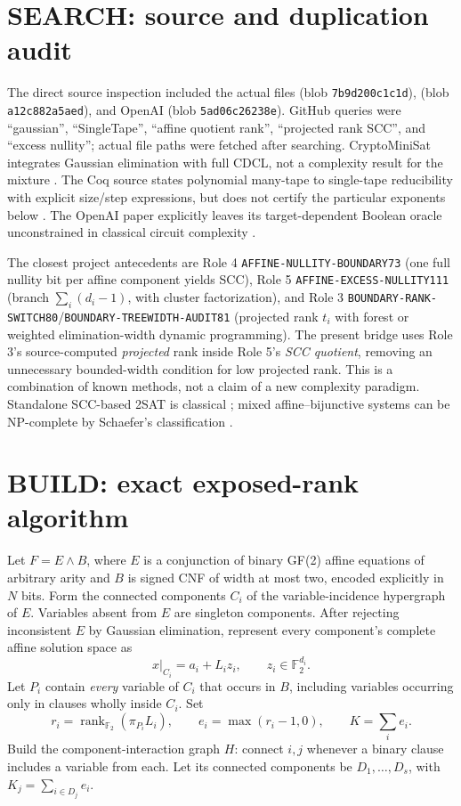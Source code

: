 \documentclass[11pt]{article}
\newcommand{\FF}{\mathbb F_2}
\begin{document}
\section{SEARCH: source and duplication audit}
The direct source inspection included the actual files  (blob \texttt{7b9d200c1c1d}),  (blob \texttt{a12c882a5aed}), and OpenAI  (blob \texttt{5ad06c26238e}). GitHub queries were ``gaussian'', ``SingleTape'', ``affine quotient rank'', ``projected rank SCC'', and ``excess nullity''; actual file paths were fetched after searching. CryptoMiniSat integrates Gaussian elimination with full CDCL, not a complexity result for the mixture \cite{cms}. The Coq source states polynomial many-tape to single-tape reducibility with explicit size/step expressions, but does not certify the particular exponents below \cite{coq}. The OpenAI paper explicitly leaves its target-dependent Boolean oracle unconstrained in classical circuit complexity \cite{openai}.

The closest project antecedents are Role 4 \texttt{AFFINE-NULLITY-BOUNDARY73} (one full nullity bit per affine component yields SCC), Role 5 \texttt{AFFINE-EXCESS-NULLITY111} (branch $\sum_i(d_i-1)$, with cluster factorization), and Role 3 \texttt{BOUNDARY-RANK-SWITCH80}/\texttt{BOUNDARY-TREEWIDTH-AUDIT81} (projected rank $t_i$ with forest or weighted elimination-width dynamic programming). The present bridge uses Role 3's source-computed \emph{projected} rank inside Role 5's \emph{SCC quotient}, removing an unnecessary bounded-width condition for low projected rank. This is a combination of known methods, not a claim of a new complexity paradigm. Standalone SCC-based 2SAT is classical \cite{apt}; mixed affine--bijunctive systems can be NP-complete by Schaefer's classification \cite{schaefer}.

\section{BUILD: exact exposed-rank algorithm}
Let $F=E\land B$, where $E$ is a conjunction of binary GF(2) affine equations of arbitrary arity and $B$ is signed CNF of width at most two, encoded explicitly in $N$ bits. Form the connected components $C_i$ of the variable-incidence hypergraph of $E$. Variables absent from $E$ are singleton components. After rejecting inconsistent $E$ by Gaussian elimination, represent every component's complete affine solution space as
\[
  x|_{C_i}=a_i+L_i z_i,\qquad z_i\in\FF^{d_i}.
\]
Let $P_i$ contain \emph{every} variable of $C_i$ that occurs in $B$, including variables occurring only in clauses wholly inside $C_i$. Set
\[
 r_i=\operatorname{rank}_{\FF}(\pi_{P_i}L_i),\qquad
 e_i=\max(r_i-1,0),\qquad
 K=\sum_i e_i.
\]
Build the component-interaction graph $H$: connect $i,j$ whenever a binary clause includes a variable from each. Let its connected components be $D_1,\ldots,D_s$, with $K_j=\sum_{i\in D_j}e_i$.
\end{document}
